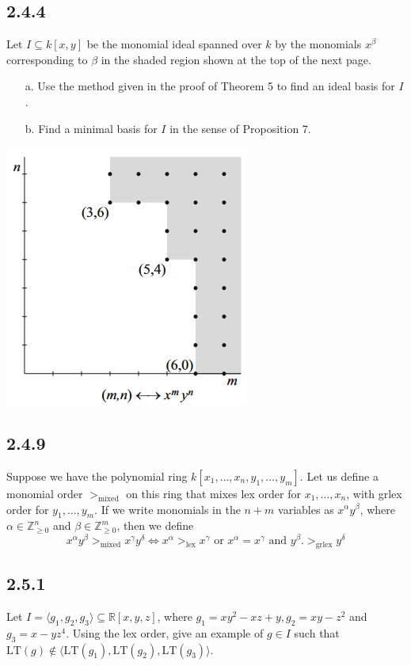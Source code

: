\documentclass[]{article}
\newcommand\<{\langle}
\renewcommand\>{\rangle}
\newcommand{\RR}{\ensuremath{\mathbb{R}}}
\newcommand{\ZZ}{\ensuremath{\mathbb{Z}}}
\begin{document}
\subsection*{2.4.4} Let $I \subseteq k[x,y]$ be the monomial ideal spanned over $k$ by the monomials $x^\beta$ corresponding to $\beta$ in the shaded region shown at the top of the next page.
\begin{enumerate}
	\item[a.] Use the method given in the proof of Theorem 5 to find an ideal basis for $I$.
	\item[b.] Find a minimal basis for $I$ in the sense of Proposition 7.
\end{enumerate}
\begin{center}
	\includegraphics{2-4-4.png}
\end{center}

\subsection*{2.4.9} Suppose we have the polynomial ring $k[x_1,\dots,x_n,y_1,\dots,y_m]$. Let us define a monomial order $>_\text{mixed}$ on this ring that mixes lex order for $x_1,\dots,x_n$, with grlex order for $y_1,\dots,y_m$. If we write monomials in the $n + m$ variables as $x^{\alpha}y^{\beta}$, where $\alpha \in \ZZ_{\geq 0}^n$ and $\beta \in \ZZ_{\geq 0}^{m}$, then we define
$$
	x^{\alpha}y^{\beta} >_{\text{mixed}} x^{\gamma}y^{\delta} \iff x^{\alpha} >_{\text{lex}} x^{\gamma} \text{ or } x^{\alpha} = x^{\gamma} \text{ and } y^{\beta}. >_{\text{grlex}}y^\delta
$$

\subsection*{2.5.1} Let $I = \<g_1,g_2,g_3\> \subseteq \RR[x,y,z]$, where $g_1 = xy^2 - xz + y, g_2 = xy - z^2$ and $g_3 = x - yz^4$. Using the lex order, give an example of $g \in I$ such that $\text{LT}(g) \notin \<\text{LT}(g_1), \text{LT}(g_2), \text{LT}(g_3)\>$.
\end{document}
